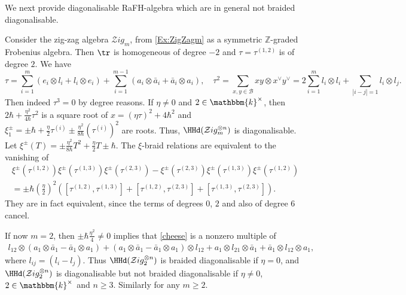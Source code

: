 \documentclass[a4paper,11pt]{amsart}
\newcommand\cB{\mathcal{B}}
\numberwithin{equation}{subsection}
\theoremstyle{definition}
\theoremstyle{theorem}
\theoremstyle{remark}
\newcommand\taui[1][i]{\tau^{(#1)}}
\newcommand\kk{\mathbbm{k}}
\begin{document}
We next provide diagonalisable RaFH-algebra which are in general not braided diagonalisable.
 \begin{Example}\label{tauZigZag}
    Consider the zig-zag algebra $\mathcal{Z}ig_m$, from \autoref{Ex:ZigZagm} as a symmetric $\mathbb{Z}$-graded Frobenius algebra. Then $\tr$ is homogeneous of degree $-2$ and  $\tau=\taui[1,2]$ is of degree $2$. We have
    \begin{equation*}
 \tau=\sum_{i=1}^{m}\left(e_i\otimes l_i+l_i\otimes e_i\right)
    +\sum_{i=1}^{m-1}\left(a_i\otimes\bar a_i+\bar a_i\otimes a_i\right), \quad
   \tau^2=\sum_{x,y\in \cB}xy\otimes x^\vee y^\vee
     =2\sum_{i=1}^{m}l_i\otimes l_i+\sum_{|i-j|=1}l_i\otimes l_j.
     \end{equation*}
     Then indeed $\tau^3=0$ by degree reasons. If $\eta\not=0$ and $2\in\kk^\times$,  then $2\hbar+\frac{\eta^{2}}{4\hbar}\tau^2$ is a square root of $x= \left(\eta\tau\right)^2+4\hbar^2$ and  $\xi^\pm_1=\pm\hbar+\frac{\eta}{2}\taui\pm\frac{\eta^{2}}{8\hbar}(\taui)^{2}$ are roots. Thus, $\HHd(\mathcal{Z}ig_m^{\otimes n})$ is diagonalisable. Let $\xi^\pm(T)=\pm\tfrac{\eta^{2}}{8\hbar}T^{2}+\tfrac{\eta}{2}T\pm\hbar$. The $\xi$-braid relations are equivalent to the vanishing of
\begin{equation}\label{cheese}
\begin{split}
    \xi^\pm(\taui[1,2])\xi^\pm(\taui[1,3])\xi^\pm(\taui[2,3])-\xi^\pm(\taui[2,3])\xi^\pm(\taui[1,3])\xi^\pm(\taui[1,2])\\
     =\pm\hbar (\tfrac{\eta}{2})^2([\taui[1,2],\taui[1,3]]+ [\taui[1,2],\taui[2,3]]+[\taui[1,3],\taui[2,3]]).
     \end{split}
     \end{equation}
They are in fact equivalent, since the terms of degrees $0$,  $2$ and also of degree $6$ cancel.

  If now $m=2$, then $\pm\hbar\frac{\eta^{2}}{4}\not=0$ implies that \autoref{cheese}
 is a nonzero multiple of
  \begin{align*}
   l_{12}\otimes(a_1\otimes\bar a_1-\bar a_1\otimes a_1)+(a_1\otimes\bar a_1-\bar a_1\otimes a_1)\otimes l_{12}+a_1\otimes l_{21}\otimes\bar a_1 +\bar a_1\otimes l_{12}\otimes a_1,
  \end{align*}
 where $l_{ij}=(l_i-l_j)$.  Thus  $\HHd(\mathcal{Z}ig_2^{\otimes n})$ is braided diagonalisable if $\eta=0$, and  $\HHd(\mathcal{Z}ig_2^{\otimes n})$ is  diagonalisable but not braided diagonalisable if $\eta\not=0$, $2\in\kk^\times$ and $n\geq3$. Similarly for any $m\geq 2$.
     \end{Example}
\end{document}

